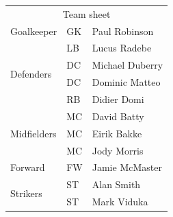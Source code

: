 \documentclass[english, a4paper]{letter}
\begin{document}
\vspace{\baselineskip}

\begin{tabular}{|l|l|l|}
\cline{1-3}
\multicolumn{3}{|c|}{Team sheet} \\
\cline{1-3}
Goalkeeper & GK & Paul Robinson \\ \cline{1-3}
\multirow{4}{*}{Defenders} & LB & Lucus Radebe \\
& DC & Michael Duberry \\
& DC & Dominic Matteo \\
& RB & Didier Domi \\ \cline{1-3}
\multirow{3}{*}{Midfielders} & MC & David Batty \\
 & MC & Eirik Bakke \\
 & MC & Jody Morris \\ \cline{1-3}
Forward & FW & Jamie McMaster \\ \cline{1-3}
\multirow{2}{*}{Strikers} & ST & Alan Smith \\
 & ST & Mark Viduka \\
\cline{1-3}
\end{tabular}

\vspace{105mm}
\end{document}
